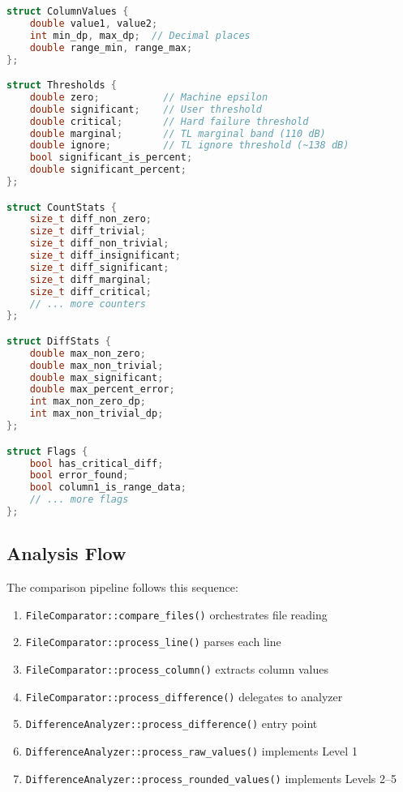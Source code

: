 \begin{lstlisting}[language=C++]
struct ColumnValues {
    double value1, value2;
    int min_dp, max_dp;  // Decimal places
    double range_min, range_max;
};

struct Thresholds {
    double zero;           // Machine epsilon
    double significant;    // User threshold
    double critical;       // Hard failure threshold
    double marginal;       // TL marginal band (110 dB)
    double ignore;         // TL ignore threshold (~138 dB)
    bool significant_is_percent;
    double significant_percent;
};

struct CountStats {
    size_t diff_non_zero;
    size_t diff_trivial;
    size_t diff_non_trivial;
    size_t diff_insignificant;
    size_t diff_significant;
    size_t diff_marginal;
    size_t diff_critical;
    // ... more counters
};

struct DiffStats {
    double max_non_zero;
    double max_non_trivial;
    double max_significant;
    double max_percent_error;
    int max_non_zero_dp;
    int max_non_trivial_dp;
};

struct Flags {
    bool has_critical_diff;
    bool error_found;
    bool column1_is_range_data;
    // ... more flags
};
\end{lstlisting}

\subsection{Analysis Flow}

The comparison pipeline follows this sequence:

\begin{enumerate}
    \item \texttt{FileComparator::compare\_files()} orchestrates file reading
    \item \texttt{FileComparator::process\_line()} parses each line
    \item \texttt{FileComparator::process\_column()} extracts column values
    \item \texttt{FileComparator::process\_difference()} delegates to analyzer
    \item \texttt{DifferenceAnalyzer::process\_difference()} entry point
    \item \texttt{DifferenceAnalyzer::process\_raw\_values()} implements Level 1
    \item \texttt{DifferenceAnalyzer::process\_rounded\_values()} implements Levels 2--5
\end{enumerate}


